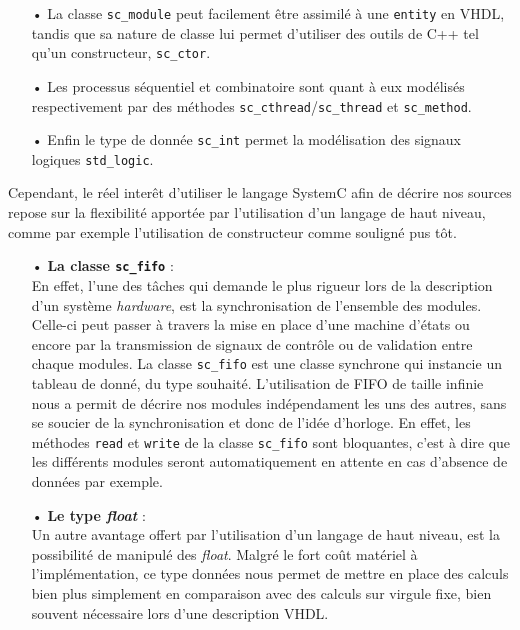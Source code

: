 \documentclass[a4paper,12pt]{article}
\begin{document}
\begin{itemize}
\item[•] La classe \texttt{sc\_module} peut facilement être assimilé à une \texttt{entity} en VHDL, tandis que sa nature de classe lui permet d'utiliser des outils de C++ tel qu'un constructeur, \texttt{sc\_ctor}.
\item[•] Les processus séquentiel et combinatoire sont quant à eux modélisés respectivement par des méthodes \texttt{sc\_cthread}/\texttt{sc\_thread} et \texttt{sc\_method}.
\item[•] Enfin le type de donnée \texttt{sc\_int} permet la modélisation des signaux logiques \texttt{std\_logic}.\\
\end{itemize}

Cependant, le réel interêt d'utiliser le langage SystemC afin de décrire nos sources repose sur la flexibilité apportée par l'utilisation d'un langage de haut niveau, comme par exemple l'utilisation de constructeur comme souligné pus tôt.

\begin{itemize}
\item[•] \textbf{La classe \texttt{sc\_fifo}} :\\
En effet, l'une des tâches qui demande le plus rigueur lors de la description d'un système \textit{hardware}, est la synchronisation de l'ensemble des modules. Celle-ci peut passer à travers la mise en place d'une machine d'états ou encore par la transmission de signaux de contrôle ou de validation entre chaque modules. La classe \texttt{sc\_fifo} est une classe synchrone qui instancie un tableau de donné, du type souhaité. L'utilisation de FIFO de taille infinie nous a permit de décrire nos modules indépendament les uns des autres, sans se soucier de la synchronisation et donc de l'idée d'horloge. En effet, les méthodes \texttt{read} et \texttt{write} de la classe \texttt{sc\_fifo} sont bloquantes, c'est à dire que les différents modules seront automatiquement en attente en cas d'absence de données par exemple.\\

\item[•] \textbf{Le type \textit{float}} :\\
Un autre avantage offert par l'utilisation d'un langage de haut niveau, est la possibilité de manipulé des \textit{float}. Malgré le fort coût matériel à l'implémentation, ce type données nous permet de mettre en place des calculs bien plus simplement en comparaison avec des calculs sur virgule fixe, bien souvent nécessaire lors d'une description VHDL.\\
\end{itemize}
\end{document}
